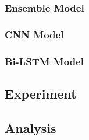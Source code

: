 \documentclass[12pt]{report} %
\begin{document}
\subsubsection{Ensemble Model}
\subsubsection{CNN Model}
\subsubsection{Bi-LSTM Model}
\subsection{Experiment}
\subsection{Analysis}
\end{document}
